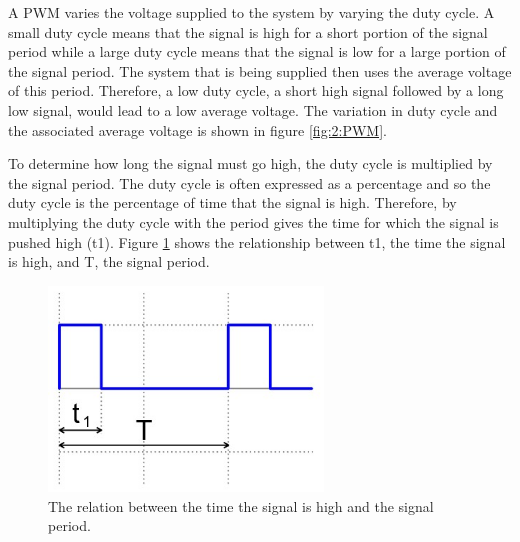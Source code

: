 \vspace{0.6cm}
A PWM varies the voltage supplied to the system by varying the duty cycle. A small duty cycle means that the signal is high for a short portion of the signal period while a large duty cycle means that the signal is low for a large portion of the signal period. The system that is being supplied then uses the average voltage of this period. Therefore, a low duty cycle, a short high signal followed by a long low signal, would lead to a low average voltage. The variation in duty cycle and the associated average voltage is shown in figure \ref{fig:2:PWM}. \cite{Ibrahim2014}\par
\vspace{0.6cm}
To determine how long the signal must go high, the duty cycle is multiplied by the signal period. The duty cycle is often expressed as a percentage and so the duty cycle is the percentage of time that the signal is high. Therefore, by multiplying the duty cycle with the period gives the time for which the signal is pushed high (t1). Figure \ref{fig:2:PWMPulse} shows the relationship between t1, the time the signal is high, and T, the signal period.\par
\vspace{0.6cm}
\begin{figure}
	\begin{center}
		\includegraphics[width = 0.65\textwidth]{figures/PulseWideWave.jpg}
		\caption{The relation between the time the signal is high and the signal period.}
		\label{fig:2:PWMPulse}
	\end{center}
\end{figure}
